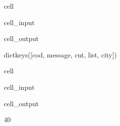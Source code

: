 \documentclass[letterpaper,10pt,english]{jupyterBook}
\begin{document}
\begin{sphinxuseclass}{cell}\begin{sphinxVerbatimInput}

\begin{sphinxuseclass}{cell_input}
\begin{sphinxVerbatim}[commandchars=\\\{\}]
\end{sphinxVerbatim}

\end{sphinxuseclass}\end{sphinxVerbatimInput}
\begin{sphinxVerbatimOutput}

\begin{sphinxuseclass}{cell_output}
\begin{sphinxVerbatim}[commandchars=\\\{\}]
dict\PYGZus{}keys([\PYGZsq{}cod\PYGZsq{}, \PYGZsq{}message\PYGZsq{}, \PYGZsq{}cnt\PYGZsq{}, \PYGZsq{}list\PYGZsq{}, \PYGZsq{}city\PYGZsq{}])
\end{sphinxVerbatim}

\end{sphinxuseclass}\end{sphinxVerbatimOutput}

\end{sphinxuseclass}
\begin{sphinxuseclass}{cell}\begin{sphinxVerbatimInput}

\begin{sphinxuseclass}{cell_input}
\begin{sphinxVerbatim}[commandchars=\\\{\}]
\PYG{p}{[}\PYG{p}{]}
\end{sphinxVerbatim}

\end{sphinxuseclass}\end{sphinxVerbatimInput}
\begin{sphinxVerbatimOutput}

\begin{sphinxuseclass}{cell_output}
\begin{sphinxVerbatim}[commandchars=\\\{\}]
40
\end{sphinxVerbatim}

\end{sphinxuseclass}\end{sphinxVerbatimOutput}

\end{sphinxuseclass}
\end{document}
